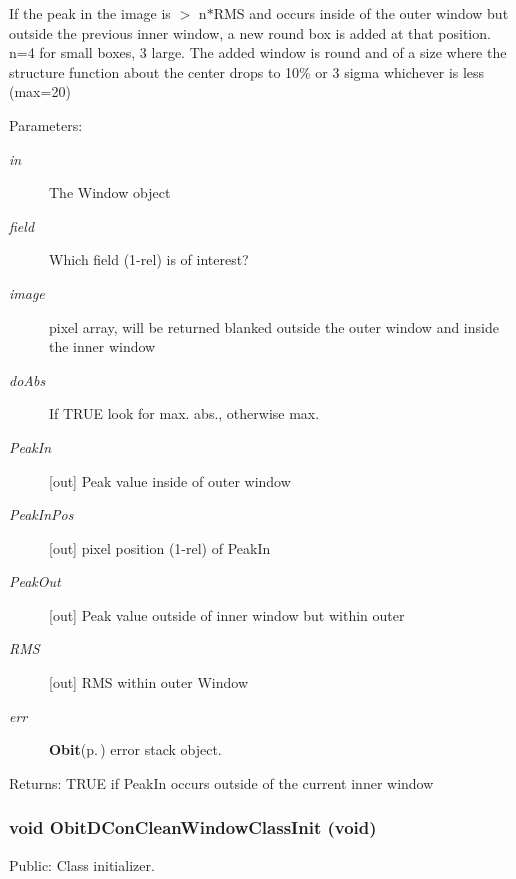 If the peak in the image is $>$ n$\ast$RMS and occurs inside of the outer window but outside the previous inner window, a new round box is added at that position. n=4 for small boxes, 3 large. The added window is round and of a size where the structure function about the center drops to 10\% or 3 sigma whichever is less (max=20) \begin{Desc}
\item[Parameters:]
\begin{description}
\item[{\em in}]The Window object \item[{\em field}]Which field (1-rel) is of interest? \item[{\em image}]pixel array, will be returned blanked outside the outer window and inside the inner window \item[{\em do\-Abs}]If TRUE look for max. abs., otherwise max. \item[{\em Peak\-In}][out] Peak value inside of outer window \item[{\em Peak\-In\-Pos}][out] pixel position (1-rel) of Peak\-In \item[{\em Peak\-Out}][out] Peak value outside of inner window but within outer\item[{\em RMS}][out] RMS within outer Window \item[{\em err}]{\bf Obit}{\rm (p.\,\pageref{structObit})} error stack object. \end{description}
\end{Desc}
\begin{Desc}
\item[Returns:]TRUE if Peak\-In occurs outside of the current inner window \end{Desc}
\subsubsection{\setlength{\rightskip}{0pt plus 5cm}void Obit\-DCon\-Clean\-Window\-Class\-Init (void)}\label{ObitDConCleanWindow_8c_a33}


Public: Class initializer. 

